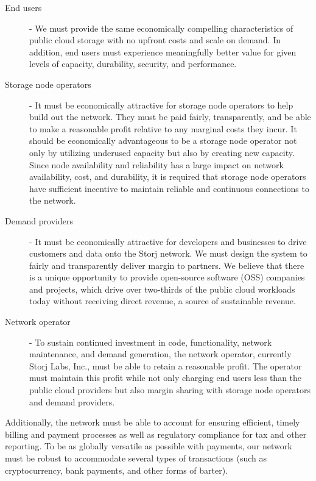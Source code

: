 \documentclass[8pt,fleqn,openany]{book}
\begin{document}
\begin{description}
\item[End users] - We must provide the same economically compelling
  characteristics of public cloud storage with no upfront costs and scale on
  demand.
  In addition, end users must experience meaningfully better value for given
  levels of capacity, durability, security, and performance.

\item[Storage node operators] - It must be economically attractive for storage
  node operators to help build out the network.
  They must be paid fairly, transparently, and be able to make a
  reasonable profit relative to any marginal costs they incur.
  It should be economically advantageous to be a storage
  node operator not only by utilizing underused capacity but also by creating new capacity.
  Since node availability and reliability has a large impact on network
  availability, cost, and durability, it is required that storage node
  operators have sufficient incentive to maintain reliable and continuous
  connections to the network.

\item[Demand providers] - It must be economically attractive for developers and
  businesses to drive customers and data onto the Storj network. We must design
  the system to fairly and transparently deliver margin to partners. We believe
  that there is a unique opportunity to provide open-source software (OSS)
  companies and projects, which drive over two-thirds of the public cloud workloads
  today without receiving direct revenue, a source of sustainable revenue.

\item[Network operator] - To sustain continued investment in code,
functionality, network maintenance, and demand generation, the network
operator, currently Storj Labs, Inc.,  must be able to retain a reasonable profit. The operator must maintain this profit while
not only charging end users less than the public cloud providers but also margin sharing
with storage node operators and demand providers.
\end{description}

Additionally, the network must be able to account for ensuring efficient, timely billing
and payment processes as well as regulatory compliance for tax and other reporting.
To be as globally versatile as possible with payments, our network must be robust to accommodate several types of transactions (such as cryptocurrency, bank payments, and other forms of barter).
\end{document}
